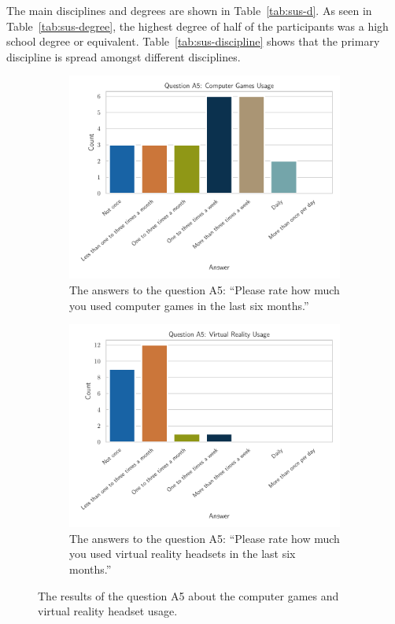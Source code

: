 The main disciplines and degrees are shown in Table~\ref{tab:sus-d}. As seen in Table~\ref{tab:sus-degree}, the highest degree of half of the participants was a high school degree or equivalent. Table~\ref{tab:sus-discipline} shows that the primary discipline is spread amongst different disciplines.

\begin{figure}[H]
  \centering
  \begin{subfigure}{.48\linewidth}%
    \centering
    \includegraphics[width=\linewidth]{figures/evaluation/res_demo_q8_s3.pdf}
    \caption{The answers to the question A5: \enquote{Please rate how much you used computer games in the last six months.}}\label{fig:res-demo-q8-s3}
  \end{subfigure}%
  \hspace{0.03\linewidth}
  \begin{subfigure}{.48\linewidth}%
    \centering
    \includegraphics[width=\linewidth]{figures/evaluation/res_demo_q8_s4.pdf}
    \caption{The answers to the question A5: \enquote{Please rate how much you used virtual reality headsets in the last six months.}}\label{fig:res-demo-q8-s4}
  \end{subfigure}%
  \caption[Computer games and virtual reality headset usage]{The results of the question A5 about the computer games and virtual reality headset usage.}\label{fig:res-demo-q8}
\end{figure}

